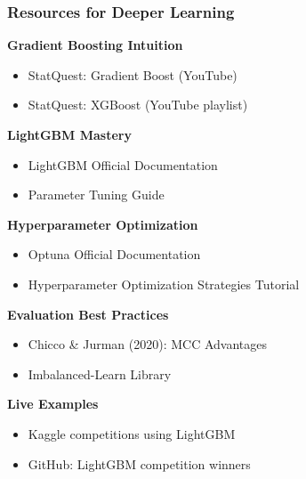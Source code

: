\documentclass{beamer}
\begin{document}
\begin{frame}[fragile]
\frametitle{Resources for Deeper Learning}

\textbf{Gradient Boosting Intuition}
\begin{itemize}
    \item StatQuest: Gradient Boost (YouTube)
    \item StatQuest: XGBoost (YouTube playlist)
\end{itemize}

\textbf{LightGBM Mastery}
\begin{itemize}
    \item LightGBM Official Documentation
    \item Parameter Tuning Guide
\end{itemize}

\textbf{Hyperparameter Optimization}
\begin{itemize}
    \item Optuna Official Documentation
    \item Hyperparameter Optimization Strategies Tutorial
\end{itemize}

\textbf{Evaluation Best Practices}
\begin{itemize}
    \item Chicco \& Jurman (2020): MCC Advantages
    \item Imbalanced-Learn Library
\end{itemize}

\textbf{Live Examples}
\begin{itemize}
    \item Kaggle competitions using LightGBM
    \item GitHub: LightGBM competition winners
\end{itemize}

\end{frame}
\end{document}
